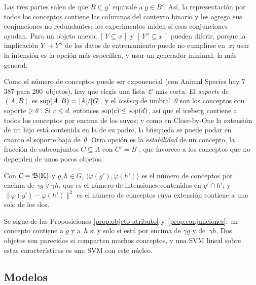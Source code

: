 Las tres partes salen de que $B \subseteq g'$ equivale a $g \in B'$. Así, la representación por todos los conceptos contiene las columnas del contexto binario y les agrega sus conjunciones no redundantes; los experimentos miden si esas conjunciones ayudan. Para un objeto nuevo, $[\, Y \subseteq x \,]$ y $[\, Y'' \subseteq x \,]$ pueden diferir, porque la implicación $Y \to Y''$ de los datos de entrenamiento puede no cumplirse en~$x$; usar la intensión es la opción más específica, y usar un generador minimal, la más general.

Como el número de conceptos puede ser exponencial (con Animal Species hay 7\,387 para 200~objetos), hay que elegir una lista~$\mathcal{C}$ más corta. El \emph{soporte} de $(A, B)$ es $\operatorname{sop}(A, B) = \lvert A \rvert / \lvert G \rvert$, y el \emph{iceberg} de umbral~$\theta$ son los conceptos con soporte${}\ge \theta$ \parencite{stumme2002}. Si $c \le d$, entonces $\operatorname{sop}(c) \le \operatorname{sop}(d)$, así que el iceberg contiene a todos los conceptos por encima de los suyos; y como en Close-by-One la extensión de un hijo está contenida en la de su padre, la búsqueda se puede podar en cuanto el soporte baja de~$\theta$. Otra opción es la \emph{estabilidad} de un concepto, la fracción de subconjuntos $C \subseteq A$ con $C' = B$ \parencite{kuznetsov2007}, que favorece a los conceptos que no dependen de unos pocos objetos.

\begin{proposicion}\label{prop:nucleo}
Con $\mathcal{C} = \mathfrak{B}(\mathbb{K})$ y $g, h \in G$, $\langle \varphi(g'), \varphi(h') \rangle$ es el número de conceptos por encima de $\gamma g \vee \gamma h$, que es el número de intensiones contenidas en $g' \cap h'$; y $\lVert \varphi(g') - \varphi(h') \rVert^2$ es el número de conceptos cuya extensión contiene a uno solo de los dos.
\end{proposicion}

Se sigue de las Proposiciones \ref{prop:objeto-atributo} y~\ref{prop:conjunciones}: un concepto contiene a $g$ y a~$h$ si y solo si está por encima de $\gamma g$ y de~$\gamma h$. Dos objetos son parecidos si comparten muchos conceptos, y una SVM lineal sobre estas características es una SVM con este núcleo.


\subsection{Modelos}
\label{sec:modelos}

